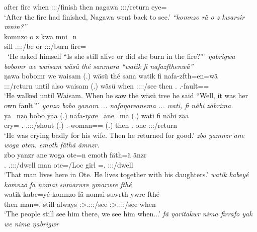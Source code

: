 \begin{exe}
	{\Dem} after fire when \Sg:\Sbj:\Pst:\Pfv/finish then nagawa \Sg:\Sbj:\Pst:\Ipfv/return eye=\Purp\\
	\trans `After the fire had finished, Nagawa went back to see.'
	\emph{``komnzo rä o z kwarsir mnin?''}\\
	\gll komnzo  o z kwa mni=n\\
	sill \Tsg.\F:\Sbj:\Nonpast:\Ipfv/be or {\Iam} \Sg:\Sbj:\Rpst:\Ipfv/burn fire=\Loc\\\
	\trans `He asked himself ``Is she still alive or did she burn in the fire?'''
\exi{100}
	\emph{ŋabrigwa bobomr we waisam wäsü thé sanmara ``watik fi nafazfthenwä''}\\
	\gll ŋa\stem{brig}wa bobomr we waisam (.) wäsü thé san\stem{mar}a watik fi nafa-zfth=en=wä\\
	\Sg:\Sbj:\Pst:\Ipfv/return until also waisam (.) wäsü when \Sg:\Sbj:\Pst:\Pfv:\Venit/see then \Third.{\Abs} \Third.\Poss-fault=\Loc={\Emph}\\
	\trans `He walked until Waisam. When he saw the wäsü tree he said ``Well, it was her own fault.'''
\exi{101}
	\emph{yanzo bobo yanora ... nafaŋareanema ... wati, fi näbi zäbrima.}\\
	\gll ya=nzo bobo ya\stem{nor}a (.) nafa-ŋare=ane=ma (.) wati fi näbi zäa\\
	cry={\Only} \Med.{\All} \Tsg.\Masc:\Sbj:\Pst:\Ipfv/shout (.) \Third.\Poss-woman=\Poss={\Char} (.) then \Third.{\Abs} one \Sg:\Sbj:\Pst:\Pfv/return\\
	\trans `He was crying badly for his wife. Then he returned for good.'
\exi{102}
	\emph{zbo yamnzr ane woga oten. emoth fäthä ämnzr.}\\
	\gll zbo yanzr ane woga ote=n emoth fäth=ä änzr\\
	\Prox.{\All} \Tsg.\Masc:\Sbj:\Nonpast:\Ipfv/dwell {\Dem} man ote=/Loc{} girl \Dim=\Assoc.{\Pl} \Stpl:\Sbj:\Nonpast:\Ipfv/dwell\\
	\trans `That man lives here in Ote. He lives together with his daughters.'
\exi{103}
	\emph{watik kabeyé komnzo fä nomai sumarwre ymarwre fthé}\\
	\gll watik kabe=yé komnzo fä nomai suwrth ywre fthé\\
	then man=\Erg.{\Nsg} still {\Dist} always \Stpl:\Sbj>\Tsg.\Masc:\Obj:\Rpst:\Ipfv/see \Fnsg:\Sbj>\Tsg.\Masc:\Obj:\Rpst:\Ipfv/see when\\
	\trans `The people still see him there, we see him when...'
	\emph{fä ŋaritakwr nima firrafo yak we nima ŋabrigwr}\\

\end{exe}
